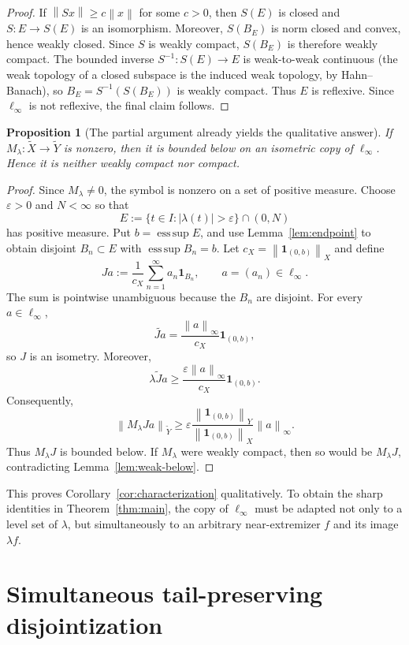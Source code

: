 \documentclass[11pt]{article}
\newtheorem{proposition}[theorem]{Proposition}
\theoremstyle{remark}
\newcommand{\esssup}{\operatorname*{ess\,sup}}
\newcommand{\tX}{\widetilde X}
\newcommand{\tY}{\widetilde Y}
\newcommand{\norm}[1]{\left\lVert #1\right\rVert}
\newcommand{\one}{\mathbf 1}
\begin{document}
\begin{proof}
If $\norm{Sx}\geq c\norm{x}$ for some $c>0$, then $S(E)$ is closed and
$S:E\to S(E)$ is an isomorphism.  Moreover, $S(B_E)$ is norm closed and
convex, hence weakly closed.  Since $S$ is weakly compact, $S(B_E)$ is
therefore weakly compact.  The bounded inverse $S^{-1}:S(E)\to E$ is
weak-to-weak continuous (the weak topology of a closed subspace is the
induced weak topology, by Hahn--Banach), so $B_E=S^{-1}(S(B_E))$ is weakly
compact.  Thus $E$ is reflexive.  Since $\ell_\infty$ is not reflexive, the
final claim follows.
\end{proof}

\begin{proposition}[The partial argument already yields the qualitative
answer]\label{prop:qualitative}
If $M_\lambda:\tX\to\tY$ is nonzero, then it is bounded below on an isometric
copy of $\ell_\infty$.  Hence it is neither weakly compact nor compact.
\end{proposition}

\begin{proof}
Since $M_\lambda\neq0$, the symbol is nonzero on a set of positive measure.
Choose $\varepsilon>0$ and $N<\infty$ so that
\[
 E:=\{t\in I:|\lambda(t)|>\varepsilon\}\cap(0,N)
\]
has positive measure.  Put $b=\esssup E$, and use Lemma~\ref{lem:endpoint}
to obtain disjoint $B_n\subset E$ with $\esssup B_n=b$.  Let
$c_X=\norm{\one_{(0,b)}}_X$ and define
\[
 Ja:=\frac1{c_X}\sum_{n=1}^\infty a_n\one_{B_n},
 \qquad a=(a_n)\in\ell_\infty.
\]
The sum is pointwise unambiguous because the $B_n$ are disjoint.  For every
$a\in\ell_\infty$,
\[
 \widetilde{Ja}=\frac{\norm{a}_\infty}{c_X}\one_{(0,b)},
\]
so $J$ is an isometry.  Moreover,
\[
 \widetilde{\lambda Ja}
 \geq \frac{\varepsilon\norm{a}_\infty}{c_X}\one_{(0,b)}.
\]
Consequently,
\[
 \norm{M_\lambda Ja}_{\tY}
 \geq \varepsilon\frac{\norm{\one_{(0,b)}}_Y}
                         {\norm{\one_{(0,b)}}_X}\norm{a}_\infty.
\]
Thus $M_\lambda J$ is bounded below.  If $M_\lambda$ were weakly compact,
then so would be $M_\lambda J$, contradicting Lemma~\ref{lem:weak-below}.
\end{proof}

This proves Corollary~\ref{cor:characterization} qualitatively.  To obtain the
sharp identities in Theorem~\ref{thm:main}, the copy of $\ell_\infty$ must be
adapted not only to a level set of $\lambda$, but simultaneously to an
arbitrary near-extremizer $f$ and its image $\lambda f$.

\section{Simultaneous tail-preserving disjointization}
\end{document}
